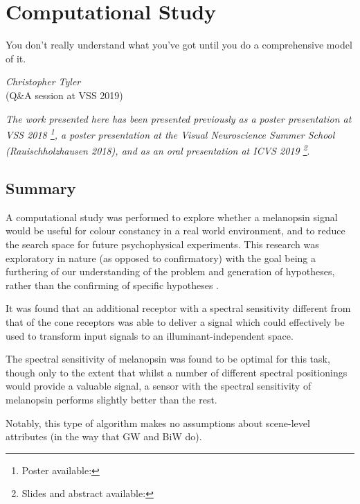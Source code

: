 \chapter{Computational Study}
\label{chap:Melcomp}

\epigraph{You don't really understand what you've got until you do a comprehensive model of it.}
{\textit{Christopher Tyler} \\ (Q\&A session at VSS 2019)}

\textit{The work presented here has been presented previously as a poster presentation at VSS 2018 \citep{garside_does_2018}\footnote{Poster available: }, a poster presentation at the Visual Neuroscience Summer School (Rauischholzhausen 2018), and as an oral presentation at ICVS 2019 \footnote{Slides and abstract available: }}.

\section{Summary}

A computational study was performed to explore whether a melanopsin signal would be useful for colour constancy in a real world environment, and to reduce the search space for future psychophysical experiments. This research was exploratory in nature (as opposed to confirmatory) with the goal being a furthering of our understanding of the problem and generation of hypotheses, rather than the confirming of specific hypotheses \citep{steinle_entering_1997}.

It was found that an additional receptor with a spectral sensitivity different from that of the cone receptors was able to deliver a signal which could effectively be used to transform input signals to an illuminant-independent space. 

The spectral sensitivity of melanopsin was found to be optimal for this task, though only to the extent that whilst a number of different spectral positionings would provide a valuable signal, a sensor with the spectral sensitivity of melanopsin performs slightly better than the rest.

Notably, this type of algorithm makes no assumptions about scene-level attributes (in the way that \acrlong{GW} and \acrlong{BiW} do).


